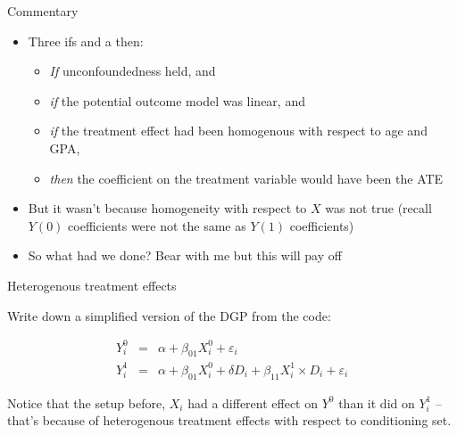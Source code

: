 \documentclass{beamer}
\begin{document}
\begin{frame}{Commentary}

\begin{itemize}

\item Three ifs and a then:

	\begin{itemize}
	\item \emph{If} unconfoundedness held, and 
	\item \emph{if} the potential outcome model was linear, and
	\item  \emph{if} the treatment effect had been homogenous with respect to age and GPA, 
	\item \emph{then} the coefficient on the treatment variable would have been the ATE 
	\end{itemize}
	
\item But it wasn't because homogeneity with respect to $X$ was not true (recall $Y(0)$ coefficients were not the same as $Y(1)$ coefficients)
\item So what had we done?  Bear with me but this will pay off
\end{itemize}

\end{frame}

\begin{frame}{Heterogenous treatment effects}

Write down a simplified version of the DGP from the code:

\begin{eqnarray*}
Y^0_i &=& \alpha + \beta_{01} X^0_i + \varepsilon_i \\
Y^1_i &=& \alpha + \beta_{01} X^0_i + \delta D_i + \beta_{11} X^1_i \times D_i + \varepsilon_i
\end{eqnarray*}

\bigskip

Notice that the setup before, $X_i$ had a different effect on $Y^0$ than it did on $Y_i^1$ -- that's because of heterogenous treatment effects with respect to conditioning set. 

\end{frame}
\end{document}
